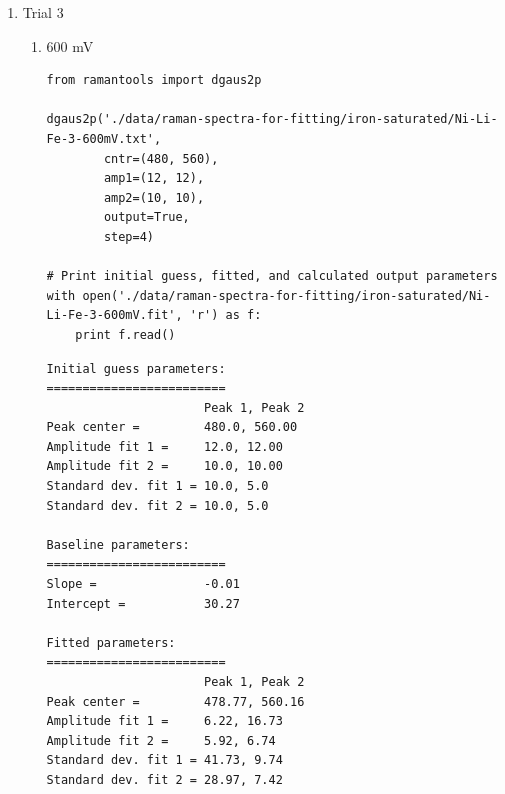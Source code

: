 \documentclass[journal=jpccck,manuscript=suppinfo,email=true]{achemso}
\begin{document}
\begin{enumerate}
\begin{enumerate}
\begin{enumerate}
\begin{verbatim}
Initial guess parameters:
=========================
                      Peak 1, Peak 2
Peak center =         480.0, 560.00
Amplitude fit 1 =     12.0, 12.00
Amplitude fit 2 =     8.0, 8.00
Standard dev. fit 1 = 10.0, 5.0
Standard dev. fit 2 = 10.0, 5.0

Baseline parameters:
=========================
Slope =               -0.01
Intercept =           23.38

Fitted parameters:
=========================
                      Peak 1, Peak 2
Peak center =         480.06, 560.95
Amplitude fit 1 =     5.48, 12.58
Amplitude fit 2 =     4.51, 5.66
Standard dev. fit 1 = 34.48, 8.79
Standard dev. fit 2 = 35.40, 8.75

Calculation output:
========================
Mean peak 1 =         480.1 $\pm$ 0.42
Mean peak 2 =         560.9 $\pm$ 0.89
Height peak 1 =       34.7 $\pm$ 0.43
Height peak 2 =       25.7 $\pm$ 0.43
Area peak 1 =         1061.2
Area peak 2 =         739.2
\end{verbatim}
\end{enumerate}

\item Trial 3
\label{sec-4-2-0-1-3}
\begin{enumerate}
\item 600 mV
\label{sec-4-2-0-1-3-1}
\begin{verbatim}
from ramantools import dgaus2p

dgaus2p('./data/raman-spectra-for-fitting/iron-saturated/Ni-Li-Fe-3-600mV.txt',
        cntr=(480, 560),
        amp1=(12, 12),
        amp2=(10, 10),
        output=True,
        step=4)

# Print initial guess, fitted, and calculated output parameters
with open('./data/raman-spectra-for-fitting/iron-saturated/Ni-Li-Fe-3-600mV.fit', 'r') as f:
    print f.read()
\end{verbatim}

\begin{verbatim}
Initial guess parameters:
=========================
                      Peak 1, Peak 2
Peak center =         480.0, 560.00
Amplitude fit 1 =     12.0, 12.00
Amplitude fit 2 =     10.0, 10.00
Standard dev. fit 1 = 10.0, 5.0
Standard dev. fit 2 = 10.0, 5.0

Baseline parameters:
=========================
Slope =               -0.01
Intercept =           30.27

Fitted parameters:
=========================
                      Peak 1, Peak 2
Peak center =         478.77, 560.16
Amplitude fit 1 =     6.22, 16.73
Amplitude fit 2 =     5.92, 6.74
Standard dev. fit 1 = 41.73, 9.74
Standard dev. fit 2 = 28.97, 7.42


\end{verbatim}
\end{enumerate}
\end{enumerate}
\end{enumerate}
\end{document}
